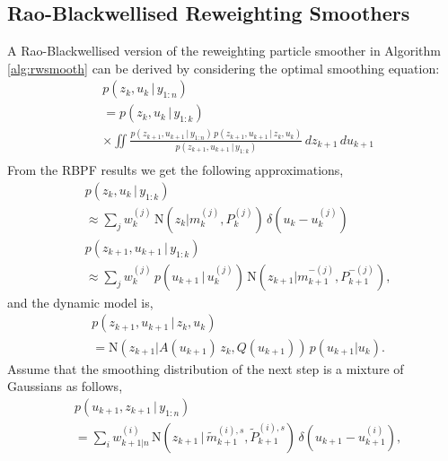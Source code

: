 \documentclass[twocolumn]{autart}    %
\begin{document}
\subsection{Rao-Blackwellised Reweighting Smoothers}
%
A Rao-Blackwellised version of the reweighting particle smoother
in Algorithm \ref{alg:rwsmooth} can be derived by considering
the optimal smoothing equation:
%
\begin{equation}
\begin{split}
 &p(z_{k},u_{k} \,|\, y_{1:n}) \\
 &= p(z_{k},u_{k}\,|\,y_{1:k}) \\
 &\times \iint
    \frac{p(z_{k+1},u_{k+1} \,|\, y_{1:n}) \, p(z_{k+1},u_{k+1}\,|\,z_{k},u_{k})}
         {p(z_{k+1},u_{k+1}\,|\,y_{1:k})} \, dz_{k+1} \, du_{k+1} \\
\end{split}
\end{equation}
%
From the RBPF results we get the following approximations,
%
\begin{equation}
\begin{split}
  &p(z_k,u_{k} \,|\, y_{1:k}) \\
  &\approx \sum_j w_k^{(j)} \, \mathrm{N}(z_{k} | m^{(j)}_{k}, P^{(j)}_{k}) \,
    \delta(u_{k} - u_{k}^{(j)}) \\
  &p(z_{k+1},u_{k+1} \,|\, y_{1:k}) \\
  &\approx \sum_j w_k^{(j)} \, p(u_{k+1}\,|\,u_k^{(j)}) \, \mathrm{N}(z_{k+1} | m^{-(j)}_{k+1}, P^{-(j)}_{k+1}),
\end{split}
\end{equation}
%
and the dynamic model is,
%
\begin{equation}
\begin{split}
  &p(z_{k+1},u_{k+1} \,|\, z_{k},u_{k}) \\
  &= \mathrm{N}(z_{k+1} | A(u_{k+1}) \, z_k, Q(u_{k+1})) \, p(u_{k+1} | u_k).
\end{split}
\end{equation}
%
Assume that the smoothing distribution of the next step is a mixture
of Gaussians as follows,
%
\begin{equation}
\begin{split}
  &p(u_{k+1},z_{k+1}\,|\,y_{1:n}) \\
  &=
    \sum_{i} w^{(i)}_{k+1|n} \, \mathrm{N}(z_{k+1}\,|\,\tilde{m}_{k+1}^{(i),s},\tilde{P}_{k+1}^{(i),s}) \,
    \delta(u_{k+1} - u_{k+1}^{(i)}),
\end{split}
\end{equation}
\end{document}

